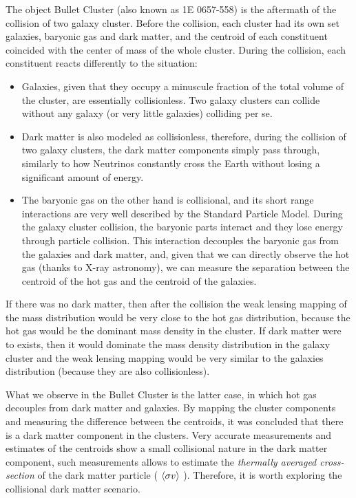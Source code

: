 The object Bullet Cluster (also known as 1E 0657-558) is the aftermath of the collision of two galaxy cluster.
Before the collision, each cluster had its own set galaxies, baryonic gas and dark matter, and the centroid of each constituent coincided with the center of mass of the whole cluster.
During the collision, each constituent reacts differently to the situation:
\begin{itemize}
\item Galaxies, given that they occupy a minuscule fraction of the total volume of the cluster, are essentially collisionless. Two galaxy clusters can collide without any galaxy (or very little galaxies) colliding per se. 
\item Dark matter is also modeled as collisionless, therefore, during the collision of two galaxy clusters, the dark matter components simply pass through, similarly to how Neutrinos constantly cross the Earth without losing a significant amount of energy.
\item The baryonic gas on the other hand is collisional, and its short range interactions are very well described by the Standard Particle Model. During the galaxy cluster collision, the baryonic parts interact and they lose energy through particle collision. This interaction decouples the baryonic gas from the galaxies and dark matter, and, given that we can directly observe the hot gas (thanks to X-ray astronomy), we can measure the separation between the centroid of the hot gas and the centroid of the galaxies.
\end{itemize}

If there was no dark matter, then after the collision the weak lensing mapping of the mass distribution would be very close to the hot gas distribution, because the hot gas would be the dominant mass density in the cluster. If dark matter were to exists, then it would dominate the mass density distribution in the galaxy cluster and the weak lensing mapping would be very similar to the galaxies distribution (because they are also collisionless).

What we observe in the Bullet Cluster is the latter case, in which hot gas decouples from dark matter and galaxies.
By mapping the cluster components and measuring the difference between the centroids, it was concluded that there is a dark matter component in the clusters.
Very accurate measurements and estimates of the centroids show a small collisional nature in the dark matter component, such measurements allows to estimate the \emph{thermally averaged cross-section} of the dark matter particle ( $\langle \sigma v \rangle$ ).
Therefore, it is worth exploring the collisional dark matter scenario.

